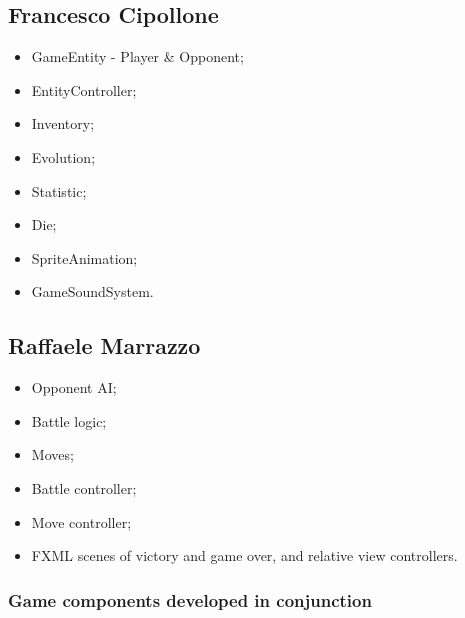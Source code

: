 \documentclass[12pt, a4paper]{report}
\theoremstyle{definition}
\begin{document}
    \subsection*{Francesco Cipollone}

    \begin{itemize}
        \item GameEntity - Player \& Opponent;
        \item EntityController;
        \item Inventory;
        \item Evolution;
        \item Statistic;
        \item Die;
        \item SpriteAnimation;
        \item GameSoundSystem.
    \end{itemize}

    \subsection*{Raffaele Marrazzo}

    \begin{itemize}
        \item Opponent AI;
        \item Battle logic;
        \item Moves;
        \item Battle controller;
        \item Move controller;
        \item FXML scenes of victory and game over, and relative view controllers.
    \end{itemize}

    \subsubsection*{Game components developed in conjunction}
\end{document}
